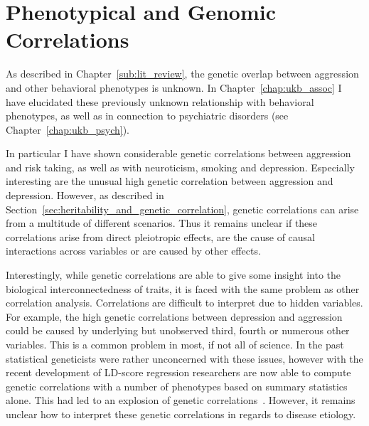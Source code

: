 \section{Phenotypical and Genomic Correlations}
\label{sec:phenotypical_and_genomic_correlations}

As described in Chapter~\ref{sub:lit_review}, the genetic overlap between aggression and other behavioral phenotypes is unknown.
In Chapter~\ref{chap:ukb_assoc} I have elucidated these previously unknown relationship with behavioral phenotypes, as well as in connection to psychiatric disorders (see Chapter~\ref{chap:ukb_psych}).

In particular I have shown considerable genetic correlations between aggression and risk taking, as well as with neuroticism, smoking and depression. 
Especially interesting are the unusual high genetic correlation between aggression and depression.
However, as described in Section~\ref{sec:heritability_and_genetic_correlation}, genetic correlations can arise from a multitude of different scenarios.
Thus it remains unclear if these correlations arise from direct pleiotropic effects, are the cause of causal interactions across variables or are caused by other effects. 

Interestingly, while genetic correlations are able to give some insight into the biological interconnectedness of traits, it is faced with the same problem as other correlation analysis. 
Correlations are difficult to interpret due to hidden variables.
For example, the high genetic correlations between depression and aggression could be caused by underlying but unobserved third, fourth or numerous other variables.
This is a common problem in most, if not all of science.
In the past statistical geneticists were rather unconcerned with these issues, however with the recent development of LD-score regression researchers are now able to compute genetic correlations with a number of phenotypes based on summary statistics alone.
This had led to an explosion of genetic correlations~\cite{Bulik-Sullivan2015b,Bulik-Sullivan2015a}.
However, it remains unclear how to interpret these genetic correlations in regards to disease etiology.

